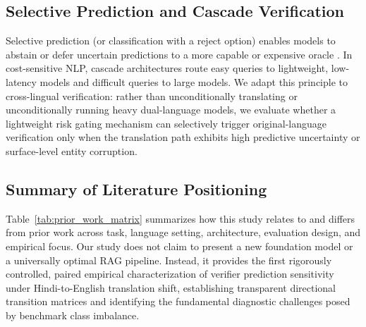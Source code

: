 \subsection{Selective Prediction and Cascade Verification}
Selective prediction (or classification with a reject option) enables models to abstain or defer uncertain predictions to a more capable or expensive oracle \citep{geifman-elyaniv-2017-selective}. In cost-sensitive NLP, cascade architectures route easy queries to lightweight, low-latency models and difficult queries to large models. We adapt this principle to cross-lingual verification: rather than unconditionally translating or unconditionally running heavy dual-language models, we evaluate whether a lightweight risk gating mechanism can selectively trigger original-language verification only when the translation path exhibits high predictive uncertainty or surface-level entity corruption.

\subsection{Summary of Literature Positioning}
Table~\ref{tab:prior_work_matrix} summarizes how this study relates to and differs from prior work across task, language setting, architecture, evaluation design, and empirical focus. Our study does not claim to present a new foundation model or a universally optimal RAG pipeline. Instead, it provides the first rigorously controlled, paired empirical characterization of verifier prediction sensitivity under Hindi-to-English translation shift, establishing transparent directional transition matrices and identifying the fundamental diagnostic challenges posed by benchmark class imbalance.


